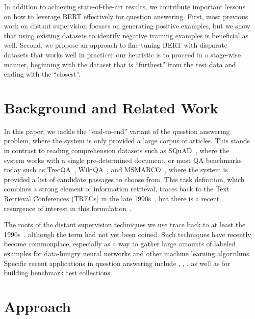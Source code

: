 \documentclass[11pt,a4paper]{article}
\begin{document}
In addition to achieving state-of-the-art results, we contribute important lessons on how to leverage BERT effectively for question answering.
First, most previous work on distant supervision focuses on generating positive examples, but we show that using existing datasets to identify negative training examples is beneficial as well.
Second, we propose an approach to fine-tuning BERT with disparate datasets that works well in practice:\ our heuristic is to proceed in a stage-wise manner, beginning with the dataset that is ``furthest'' from the test data and ending with the ``closest''.

\vspace{-0.05cm}
\section{Background and Related Work}
\vspace{-0.05cm}

In this paper, we tackle the ``end-to-end'' variant of the question answering problem, where the system is only provided a large corpus of articles.
This stands in contrast to reading comprehension datasets such as SQuAD~\cite{D16-1264}, where the system works with a single pre-determined document, or most QA benchmarks today such as TrecQA~\cite{Yao13answerextraction}, Wiki\-QA~\cite{yang2015wikiqa}, and MSMARCO~\cite{nguyen2016ms}, where the system is provided a list of candidate passages to choose from.
This task definition, which combines a strong element of information retrieval, traces back to the Text Retrieval Conferences (TRECs) in the late 1990s~\cite{Voorhees_Tice_TREC8}, but there is a recent resurgence of interest in this formulation~\cite{P17-1171}.

The roots of the distant supervision techniques we use trace back to at least the 1990s~\cite{P95-1026,Riloff:1996:AGE:1864519.1864542}, although the term had not yet been coined.
Such techniques have recently become commonplace, especially as a way to gather large amounts of labeled examples for data-hungry neural networks and other machine learning algorithms.
Specific recent applications in question answering include \citet{bordes2015large}, \citet{P17-1171}, \citet{P18-1161}, as well as \citet{P17-1147} for building benchmark test collections.

\section{Approach}
\end{document}
